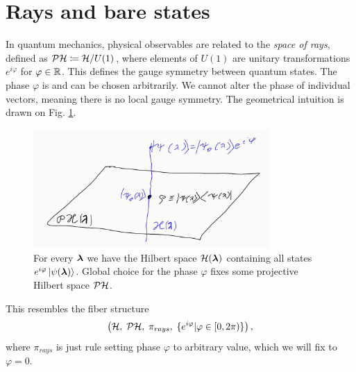 \section{Rays and bare states}
In quantum mechanics, physical observables are related to the \emph{space of rays}, defined as $\mathcal{P}\mathcal{H}\coloneqq \mathcal{H}/U(1)$, where elements of $U(1)$ are unitary transformations $e^{i\varphi}$ for $\varphi\in\mathbb{R}$. This defines the  gauge symmetry between quantum states. The phase $\varphi$ is  and can be chosen arbitrarily. We cannot alter the phase of individual vectors, meaning there is no local gauge symmetry. The geometrical intuition is drawn on Fig. \ref{fig:projectiveHilbertSpace}.
\begin{figure}[H]
    \centering
    \includegraphics[width=0.8\textwidth]{../img/projectiveHilbertSpace.png}
\caption{For every ${\bm\lambda}$ we have the Hilbert space $\mathcal{H}({\bm\lambda})$ containing all states $e^{i\varphi}\ket{\psi({\bm\lambda})}$. Global choice for the phase $\varphi$ fixes some projective Hilbert space $\mathcal{P}\mathcal{H}$. }
    \label{fig:projectiveHilbertSpace}
\end{figure}

This resembles the fiber structure
$$\left(\mathcal{H},\;\mathcal{P}\mathcal{H},\;\pi_{rays},\;\{e^{i\varphi}| \varphi\in[0,2\pi)\}\right),$$
where $\pi_{rays}$ is just rule setting phase $\varphi$ to arbitrary value, which we will fix to $\varphi=0$.







